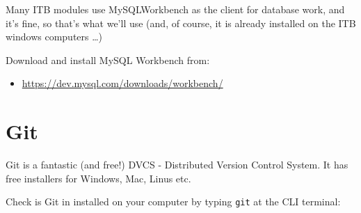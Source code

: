 \documentclass[a4paperpaper,openright]{book}
\providecommand{\tightlist}{%
  \setlength{\itemsep}{0pt}\setlength{\parskip}{0pt}}
\begin{document}
Many ITB modules use MySQLWorkbench as the client for database work, and
it's fine, so that's what we'll use (and, of course, it is already
installed on the ITB windows computers \ldots{})

Download and install MySQL Workbench from:

\begin{itemize}
\tightlist
\item
  \url{https://dev.mysql.com/downloads/workbench/}
\end{itemize}

\hypertarget{git}{%
\section{Git}\label{git}}

Git is a fantastic (and free!) DVCS - Distributed Version Control
System. It has free installers for Windows, Mac, Linus etc.

Check is Git in installed on your computer by typing \texttt{git} at the
CLI terminal:
\end{document}
